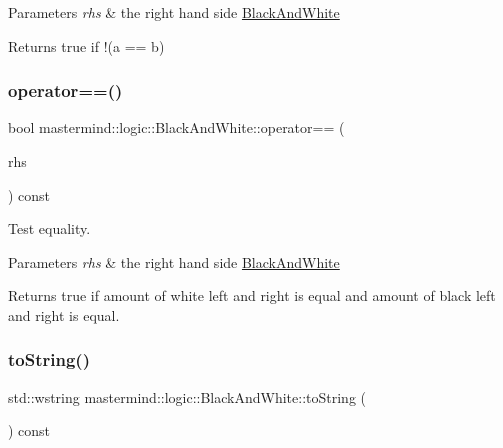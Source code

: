 \begin{DoxyParams}{Parameters}
{\em rhs} & the right hand side \hyperlink{classmastermind_1_1logic_1_1_black_and_white}{Black\+And\+White} \\
\hline
\end{DoxyParams}
\begin{DoxyReturn}{Returns}
{\ttfamily true} if {\ttfamily !(a == b)} 
\end{DoxyReturn}
\hypertarget{classmastermind_1_1logic_1_1_black_and_white_ade7da8e1b846896a978f619b9689a7cb}{}\label{classmastermind_1_1logic_1_1_black_and_white_ade7da8e1b846896a978f619b9689a7cb} 
\subsubsection{\texorpdfstring{operator==()}{operator==()}}
{\footnotesize\ttfamily bool mastermind\+::logic\+::\+Black\+And\+White\+::operator== (\begin{DoxyParamCaption}\item[{const \hyperlink{classmastermind_1_1logic_1_1_black_and_white}{Black\+And\+White} \&}]{rhs }\end{DoxyParamCaption}) const}



Test equality. 


\begin{DoxyParams}{Parameters}
{\em rhs} & the right hand side \hyperlink{classmastermind_1_1logic_1_1_black_and_white}{Black\+And\+White} \\
\hline
\end{DoxyParams}
\begin{DoxyReturn}{Returns}
{\ttfamily true} if amount of white left and right is equal and amount of black left and right is equal. 
\end{DoxyReturn}
\hypertarget{classmastermind_1_1logic_1_1_black_and_white_aaa1108efb71702c9cdf6ac9a9ad4a0c9}{}\label{classmastermind_1_1logic_1_1_black_and_white_aaa1108efb71702c9cdf6ac9a9ad4a0c9} 
\subsubsection{\texorpdfstring{to\+String()}{toString()}}
{\footnotesize\ttfamily std\+::wstring mastermind\+::logic\+::\+Black\+And\+White\+::to\+String (\begin{DoxyParamCaption}{ }\end{DoxyParamCaption}) const\hspace{0.3cm}{\ttfamily [virtual]}}



